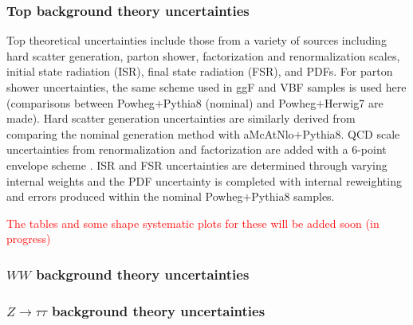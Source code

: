 \subsubsection{Top background theory uncertainties}
Top theoretical uncertainties include those from a variety of sources including hard scatter generation, parton shower, factorization and renormalization scales, initial state radiation (ISR), final state radiation (FSR), and PDFs. For parton shower uncertainties, the same scheme used in ggF and VBF samples is used here (comparisons between Powheg$+$Pythia8 (nominal) and Powheg$+$Herwig7 are made). Hard scatter generation uncertainties are similarly derived from comparing the nominal generation method with aMcAtNlo$+$Pythia8. QCD scale uncertainties from renormalization and factorization are added with a 6-point envelope scheme \cite{?}. ISR and FSR uncertainties are determined through varying internal weights and the PDF uncertainty is completed with internal reweighting and errors produced within the nominal Powheg$+$Pythia8 samples. 

\textcolor{red}{The tables and some shape systematic plots for these will be added soon (in progress)}

\subsubsection{$WW$ background theory uncertainties}

\subsubsection{$Z\rightarrow\tau\tau$ background theory uncertainties}
